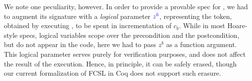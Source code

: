 \noindent
We note one peculiarity, however. In order to provide a provable spec
for , we had to augment its signature with a
\emph{logical} parameter $\textcolor{blue}{z^b}$, representing the token,
obtained by executing , to be spent in incrementation of
$c_b$. While in most Hoare-style specs, logical variables scope over
the precondition and the postcondition, but do not appear in the code,
here we had to pass $z^b$ as a function argument.
%
This logical parameter serves purely for verification purposes, and
does not affect the result of the execution. Hence, in principle, it
can be safely erased, though our current formalization of FCSL in Coq
does not support such erasure.


